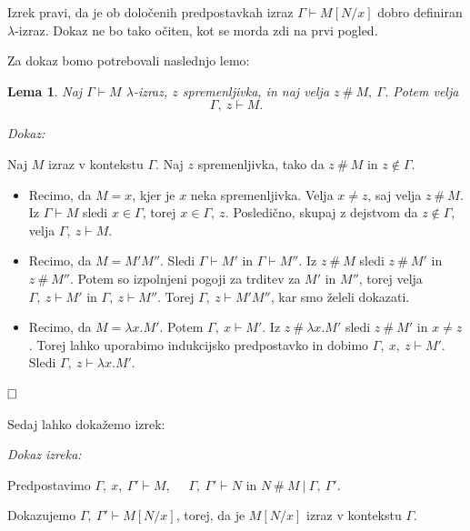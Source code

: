 \documentclass{article}
\def\qed{$\hfill\Box$}   %
\newtheorem{lema}{Lema}
\begin{document}
Izrek pravi, da je ob določenih predpostavkah izraz \(\Gamma \vdash M[N/x]\) dobro definiran \(\lambda\)-izraz. Dokaz ne bo tako očiten, kot se morda zdi na prvi pogled.

Za dokaz bomo potrebovali naslednjo lemo:

\begin{lema}
    Naj \(\Gamma \vdash M\) \(\lambda\)-izraz, \(z\) spremenljivka, in naj velja \(z \ \#\  M,\ \Gamma\). Potem velja \[
        \Gamma,\ z \vdash M.
    \]
\end{lema}

\noindent
{\em Dokaz:\/}

Naj \(M\) izraz v kontekstu \(\Gamma\). Naj \(z\) spremenljivka, tako da \(z \ \#\  M\) in \(z \notin \Gamma\).

\begin{itemize}
    \item Recimo, da \(M = x\), kjer je \(x\) neka spremenljivka. Velja \(x \neq z\), saj velja \(z \ \#\  M\). Iz \(\Gamma \vdash M\) sledi \(x \in \Gamma\), torej \(x \in \Gamma,\ z\). Posledično, skupaj z dejstvom da \(z \notin \Gamma\), velja \(\Gamma,\ z \vdash M\).

    \item Recimo, da \(M = M'M''\). Sledi \(\Gamma \vdash M'\) in \(\Gamma \vdash M''\). Iz \(z \ \#\  M\) sledi \(z \ \#\  M'\) in \(z \ \#\  M''\). Potem so izpolnjeni pogoji za trditev za \(M'\) in \(M''\), torej velja \(\Gamma,\ z \vdash M'\) in \(\Gamma,\ z \vdash M''\). Torej \(\Gamma,\ z \vdash M'M''\), kar smo želeli dokazati.

    \item Recimo, da \(M = \lambda x. M'\). Potem \(\Gamma,\ x \vdash M'\). Iz \(z \ \#\  \lambda x. M'\) sledi \(z \ \#\  M'\) in \(x \neq z\). Torej lahko uporabimo indukcijsko predpostavko in dobimo \(\Gamma,\ x,\ z \vdash M'\). Sledi \(\Gamma,\ z \vdash \lambda x. M'\).
\end{itemize}

\qed

Sedaj lahko dokažemo izrek:

\noindent
{\em Dokaz izreka:\/}

Predpostavimo \(\Gamma,\ x,\ \Gamma' \vdash M\),\ \ \ \(\Gamma,\ \Gamma' \vdash N\) in \(N \ \#\  M \ \vert\  \Gamma,\ \Gamma'\).

Dokazujemo \(\Gamma,\ \Gamma' \vdash M[N/x]\), torej, da je \(M[N/x]\) izraz v kontekstu \(\Gamma\).
\end{document}
